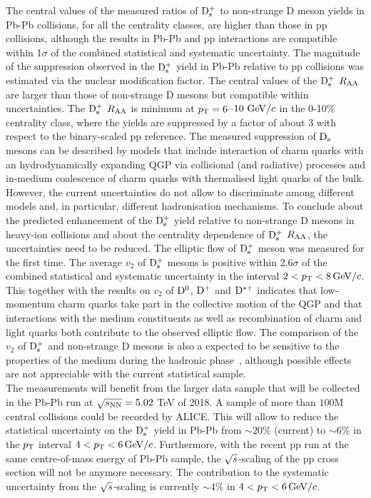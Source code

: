 The central values of the measured ratios of ${\rm D_s^+}$ to non-strange D meson yields in Pb-Pb collisions,
for all the centrality classes, are higher than those in pp collisions, although the results in Pb-Pb and pp interactions are compatible
within 1$\sigma$ of the combined statistical and systematic uncertainty.
The magnitude of the suppression observed in the ${\rm D_s^+}$ yield in Pb-Pb  
relative to pp collisions was estimated via the nuclear modification factor.
The central values of the ${\rm D_s^+}$ $R_{\rm AA}$ are larger than those of 
non-strange D mesons but compatible within uncertainties. The ${\rm D_s^+}$ $R_{\rm AA}$ is minimum
at $p_{\rm T}=6$--$10~\mathrm{GeV}/c$ in the 0-10\% centrality class, 
where the yields are suppressed by a factor of about 3 with respect to the binary-scaled pp reference.
The measured suppression of ${\rm D_s}$ mesons
can be described by models that include interaction of charm quarks with an hydrodynamically expanding QGP 
via collisional (and radiative) processes and in-medium coalescence of charm quarks
with thermalised light quarks of the bulk. However, the current uncertainties do not allow
to discriminate among different models and, in particular, different hadronisation mechanisms. To conclude about the 
predicted enhancement of the ${\rm D_s^+}$ yield relative to non-strange D mesons in 
heavy-ion collisions and about the centrality dependence of ${\rm D_s^+}$ $R_{\rm AA}$, the 
uncertainties need to be reduced.
The elliptic flow of ${\rm D_s^+}$ meson was measured for the first time. The
 average $v_2$ of ${\rm D_s^+}$ mesons is positive within 2.6$\sigma$ of the combined statistical and systematic 
 uncertainty in the interval $2 < p_{\rm T} <8 \, \mathrm{GeV}/c$. This together with the results on $v_2$ of ${\rm D^0}$, ${\rm D^+}$ and
 ${\rm D^{*+}}$ indicates that low-momentum charm quarks take part in the
collective motion of the QGP and that interactions with the medium constituents as well as recombination of charm
and light quarks both contribute to the observed elliptic flow. The comparison of the $v_2$ of ${\rm D_s^+}$ and
 non-strange D mesons is also a expected to be sensitive to the properties of the medium during the hadronic phase~\cite{He:2014cla},
 although possible effects are not appreciable with the current statistical sample.\\
 
 
 The measurements will benefit from the larger data sample that will be collected in the Pb-Pb run at 
 $\sqrt{s_{\rm NN}}=5.02$ TeV of 2018. A sample of more than $100$M central
 collisions could be recorded by ALICE. This will allow to reduce the statistical uncertainty
 on the ${\rm D_s^+}$ yield in Pb-Pb from $\sim 20\%$ (current) to $\sim 6\%$ in the 
 $p_{\rm T}$ interval $4 < p_{\rm T} < 6 \, \mathrm{GeV}/c$. Furthermore, with the recent pp run at the same centre-of-mass energy
 of Pb-Pb sample, the $\sqrt{s}$-scaling of the pp cross section will not be anymore necessary. 
 The contribution to the systematic uncertainty from the $\sqrt{s}$-scaling is currently $\sim4\%$ in $4 < p_{\rm T} < 6 \, \mathrm{GeV}/c$.\\
 
